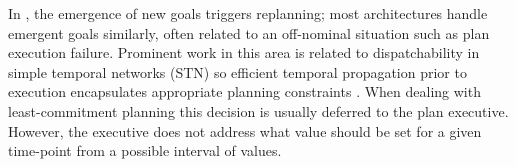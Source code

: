 In \cite{lemai-chenevier2004}, the emergence of new goals triggers
replanning; most architectures handle emergent goals similarly, often
related to an off-nominal situation such as plan execution
failure. Prominent work in this area is related to dispatchability in
simple temporal networks (STN) so efficient temporal propagation prior
to execution encapsulates appropriate planning constraints
\cite{mus98a}.
When dealing with least-commitment planning this decision is usually
deferred to the plan executive.  However, the executive does not
address what value should be set for a given time-point from a
possible interval of values.




